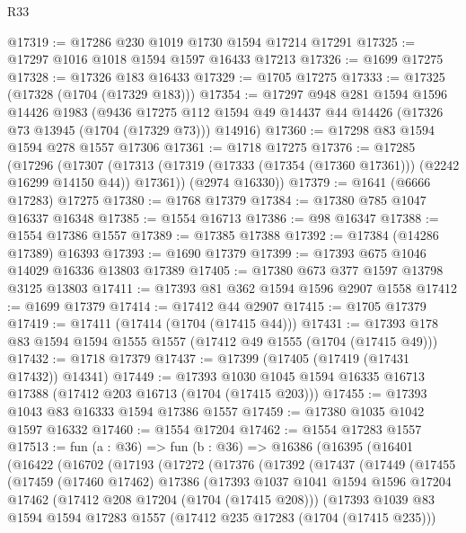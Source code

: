 \begin{lexlean}{R33}
\begin{coremodule}
@17319 := @17286 @230 @1019 @1730 @1594 @17214 @17291
@17325 := @17297 @1016 @1018 @1594 @1597 @16433 @17213
@17326 := @1699 @17275
@17328 := @17326 @183 @16433
@17329 := @1705 @17275
@17333 := @17325 (@17328 (@1704 (@17329 @183)))
@17354 := @17297
    @948
    @281
    @1594
    @1596
    @14426
    @1983
    (@9436 @17275 @112 @1594 @49 @14437 @44 @14426 (@17326 @73 @13945 (@1704 (@17329 @73))) @14916)
@17360 := @17298 @83 @1594 @1594 @278 @1557 @17306
@17361 := @1718 @17275
@17376 := @17285
    (@17296
      (@17307 (@17313 (@17319 (@17333 (@17354 (@17360 @17361))) (@2242 @16299 @14150 @44)) @17361))
      (@2974 @16330))
@17379 := @1641 (@6666 @17283) @17275
@17380 := @1768 @17379
@17384 := @17380 @785 @1047 @16337 @16348
@17385 := @1554 @16713
@17386 := @98 @16347
@17388 := @1554 @17386 @1557
@17389 := @17385 @17388
@17392 := @17384 (@14286 @17389) @16393
@17393 := @1690 @17379
@17399 := @17393 @675 @1046 @14029 @16336 @13803 @17389
@17405 := @17380 @673 @377 @1597 @13798 @3125 @13803
@17411 := @17393 @81 @362 @1594 @1596 @2907 @1558
@17412 := @1699 @17379
@17414 := @17412 @44 @2907
@17415 := @1705 @17379
@17419 := @17411 (@17414 (@1704 (@17415 @44)))
@17431 := @17393 @178 @83 @1594 @1594 @1555 @1557 (@17412 @49 @1555 (@1704 (@17415 @49)))
@17432 := @1718 @17379
@17437 := @17399 (@17405 (@17419 (@17431 @17432)) @14341)
@17449 := @17393 @1030 @1045 @1594 @16335 @16713 @17388 (@17412 @203 @16713 (@1704 (@17415 @203)))
@17455 := @17393 @1043 @83 @16333 @1594 @17386 @1557
@17459 := @17380 @1035 @1042 @1597 @16332
@17460 := @1554 @17204
@17462 := @1554 @17283 @1557
@17513 := fun (a : @36) =>
  fun (b : @36) =>
  @16386
    (@16395
      (@16401
        (@16422
          (@16702
            (@17193
              (@17272
                (@17376
                  (@17392
                    (@17437
                      (@17449
                        (@17455
                          (@17459
                            (@17460 @17462)
                            @17386
                            (@17393
                              @1037
                              @1041
                              @1594
                              @1596
                              @17204
                              @17462
                              (@17412 @208 @17204 (@1704 (@17415 @208)))
                              (@17393
                                @1039
                                @83
                                @1594
                                @1594
                                @17283
                                @1557
                                (@17412 @235 @17283 (@1704 (@17415 @235)))

\end{coremodule}
\end{lexlean}
